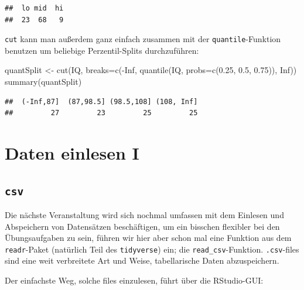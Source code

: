 \documentclass[
]{book}
\newenvironment{Shaded}{\begin{snugshade}}{\end{snugshade}}
\newcommand{\AttributeTok}[1]{\textcolor[rgb]{0.77,0.63,0.00}{#1}}
\newcommand{\ConstantTok}[1]{\textcolor[rgb]{0.00,0.00,0.00}{#1}}
\newcommand{\FloatTok}[1]{\textcolor[rgb]{0.00,0.00,0.81}{#1}}
\newcommand{\FunctionTok}[1]{\textcolor[rgb]{0.00,0.00,0.00}{#1}}
\newcommand{\NormalTok}[1]{#1}
\newcommand{\OtherTok}[1]{\textcolor[rgb]{0.56,0.35,0.01}{#1}}
\newcommand{\SpecialCharTok}[1]{\textcolor[rgb]{0.00,0.00,0.00}{#1}}
\begin{document}
\begin{verbatim}
##  lo mid  hi 
##  23  68   9
\end{verbatim}

\texttt{cut} kann man außerdem ganz einfach zusammen mit der \texttt{quantile}-Funktion benutzen um beliebige Perzentil-Splits durchzuführen:

\begin{Shaded}
\begin{Highlighting}[]
\NormalTok{quantSplit }\OtherTok{\textless{}{-}} \FunctionTok{cut}\NormalTok{(IQ,}
                  \AttributeTok{breaks=}\FunctionTok{c}\NormalTok{(}\SpecialCharTok{{-}}\ConstantTok{Inf}\NormalTok{, }
                           \FunctionTok{quantile}\NormalTok{(IQ, }
                                    \AttributeTok{probs=}\FunctionTok{c}\NormalTok{(}\FloatTok{0.25}\NormalTok{,}
                                            \FloatTok{0.5}\NormalTok{, }
                                            \FloatTok{0.75}\NormalTok{)), }
                           \ConstantTok{Inf}\NormalTok{))}
\FunctionTok{summary}\NormalTok{(quantSplit)}
\end{Highlighting}
\end{Shaded}

\begin{verbatim}
##  (-Inf,87]  (87,98.5] (98.5,108] (108, Inf] 
##         27         23         25         25
\end{verbatim}

\hypertarget{daten-einlesen-i}{%
\section{Daten einlesen I}\label{daten-einlesen-i}}

\hypertarget{csv}{%
\subsection{\texorpdfstring{\texttt{csv}}{csv}}\label{csv}}

Die nächste Veranstaltung wird sich nochmal umfassen mit dem Einlesen und Abspeichern von Datensätzen beschäftigen, um ein bisschen flexibler bei den Übungsaufgaben zu sein, führen wir hier aber schon mal eine Funktion aus dem \texttt{readr}-Paket (natürlich Teil des \texttt{tidyverse}) ein; die \texttt{read\_csv}-Funktion. \texttt{.csv}-files sind eine weit verbreitete Art und Weise, tabellarische Daten abzuspeichern.

Der einfachste Weg, solche files einzulesen, führt über die RStudio-GUI:
\end{document}
